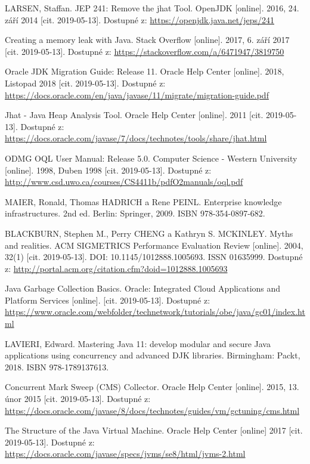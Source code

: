 \begin{literatura}{99}
    LARSEN, Staffan. JEP 241: Remove the jhat Tool. OpenJDK [online]. 2016, 24. září 2014 [cit. 2019-05-13]. Dostupné z: \url{https://openjdk.java.net/jeps/241}

    Creating a memory leak with Java. Stack Overflow [online]. 2017, 6. září 2017 [cit. 2019-05-13]. Dostupné z: \url{https://stackoverflow.com/a/6471947/3819750}

    Oracle JDK Migration Guide: Release 11. Oracle Help Center [online]. 2018, Listopad 2018 [cit. 2019-05-13]. Dostupné z: \url{https://docs.oracle.com/en/java/javase/11/migrate/migration-guide.pdf }

    Jhat - Java Heap Analysis Tool. Oracle Help Center [online]. 2011 [cit. 2019-05-13]. Dostupné z: \url{https://docs.oracle.com/javase/7/docs/technotes/tools/share/jhat.html}

    ODMG OQL User Manual: Release 5.0. Computer Science - Western University [online]. 1998, Duben 1998 [cit. 2019-05-13]. Dostupné z: \url{http://www.csd.uwo.ca/courses/CS4411b/pdfO2manuals/oql.pdf}

    MAIER, Ronald, Thomas HADRICH a Rene PEINL. Enterprise knowledge infrastructures. 2nd ed. Berlin: Springer, 2009. ISBN 978-354-0897-682.

    BLACKBURN, Stephen M., Perry CHENG a Kathryn S. MCKINLEY. Myths and realities. ACM SIGMETRICS Performance Evaluation Review [online]. 2004, 32(1) [cit. 2019-05-13]. DOI: 10.1145/1012888.1005693. ISSN 01635999. Dostupné z: \url{http://portal.acm.org/citation.cfm?doid=1012888.1005693}

    Java Garbage Collection Basics. Oracle: Integrated Cloud Applications and Platform Services [online]. [cit. 2019-05-13]. Dostupné z: \url{https://www.oracle.com/webfolder/technetwork/tutorials/obe/java/gc01/index.html}

    LAVIERI, Edward. Mastering Java 11: develop modular and secure Java applications using concurrency and advanced DJK libraries. Birmingham: Packt, 2018. ISBN 978-1789137613.

    Concurrent Mark Sweep (CMS) Collector. Oracle Help Center [online]. 2015, 13. únor 2015 [cit. 2019-05-13]. Dostupné z: \url{https://docs.oracle.com/javase/8/docs/technotes/guides/vm/gctuning/cms.html}

    The Structure of the Java Virtual Machine. Oracle Help Center [online] 2017 [cit. 2019-05-13]. Dostupné z: \url{https://docs.oracle.com/javase/specs/jvms/se8/html/jvms-2.html}


\end{literatura}
